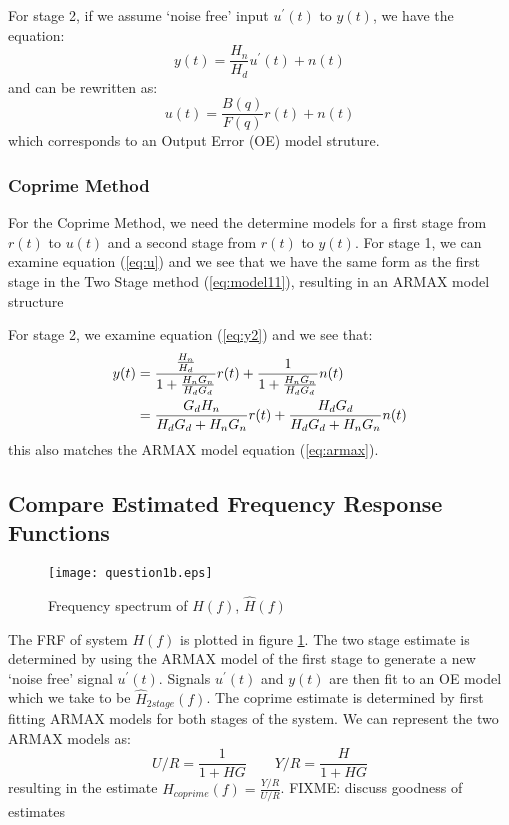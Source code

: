 \documentclass[11pt,a4paper]{article}
\begin{document}
For stage 2, if we assume `noise free' input $u^\prime(t)$ to $y(t)$, we have
the equation:
\begin{equation}
    y(t) = \frac{H_n}{H_d}u^\prime(t) + n(t) \label{eq:model12}
\end{equation}
and can be rewritten as:
\begin{equation}
    u(t) = \frac{B(q)}{F(q)}r(t) + n(t) \label{eq:oe}
\end{equation}
which corresponds to an Output Error (OE) model struture.

\subsubsection{Coprime Method}
For the Coprime Method, we need the determine models for a first stage from
$r(t)$ to $u(t)$ and a second stage from $r(t)$ to $y(t)$. For stage 1, we can
examine equation (\ref{eq:u}) and we see that we have the same form as the
first stage in the Two Stage method (\ref{eq:model11}), resulting in an ARMAX
model structure

For stage 2, we examine equation (\ref{eq:y2}) and we see that:
\begin{align}
    y(t) &= \frac{\frac{H_n}{H_d}}{1 + \frac{H_nG_n}{H_dG_d}}r(t) +
        \frac{1}{1 + \frac{H_nG_n}{H_dG_d}}n(t) \notag \\
    &= \frac{G_dH_n}{H_dG_d + H_nG_n}r(t) +
        \frac{H_dG_d}{H_dG_d + H_nG_n}n(t)  \label{eq:model22}
\end{align}
this also matches the ARMAX model equation (\ref{eq:armax}).

\subsection{Compare Estimated Frequency Response Functions}
\begin{figure}
    \begin{center}
        \texttt{[image: question1b.eps]}
    \end{center}
    \caption{Frequency spectrum of $H(f)$, $\hat{H}(f)$}
    \label{fig:1b}
\end{figure}
The FRF of system $H(f)$ is plotted in figure \ref{fig:1b}. The two stage
estimate is determined by using the ARMAX model of the first stage to generate
a new `noise free' signal $u^\prime(t)$. Signals $u^\prime(t)$ and $y(t)$ are
then fit to an OE model which we take to be $\hat{H}_{2stage}(f)$. The coprime
estimate is determined by first fitting ARMAX models for both stages of the
system. We can represent the two ARMAX models as:
\begin{equation*}
    U/R = \frac{1}{1 + HG} \qquad Y/R = \frac{H}{1 + HG}
\end{equation*}
resulting in the estimate $\hat{H}_{coprime}(f) = \frac{Y/R}{U/R}$.
FIXME: discuss goodness of estimates
\end{document}
